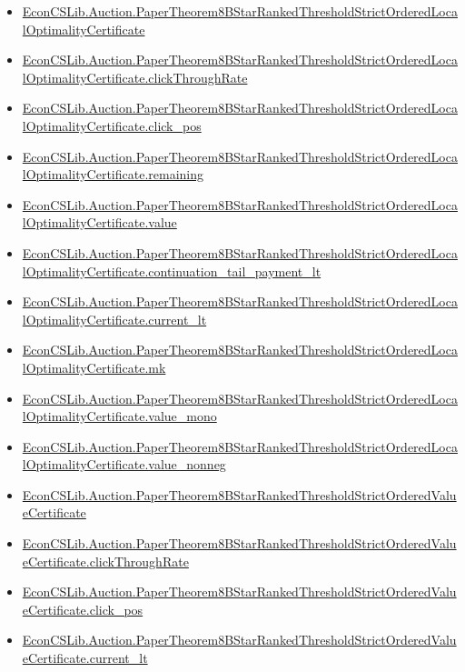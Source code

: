 \documentclass[10pt]{article}
\begin{document}
\begin{itemize}[leftmargin=1.2em]
\begin{itemize}[leftmargin=1.2em]
\item \hyperlink{library-prerequisite-26ead641d2091d6d}{EconCSLib.Auction.PaperTheorem8BStarRankedThresholdStrictOrderedLocalOptimalityCertificate}
\item \hyperlink{library-prerequisite-37cbd40ac442a1ae}{EconCSLib.Auction.PaperTheorem8BStarRankedThresholdStrictOrderedLocalOptimalityCertificate.clickThroughRate}
\item \hyperlink{library-prerequisite-9468ef40b82b377c}{EconCSLib.Auction.PaperTheorem8BStarRankedThresholdStrictOrderedLocalOptimalityCertificate.click\_pos}
\item \hyperlink{library-prerequisite-141b690500754a69}{EconCSLib.Auction.PaperTheorem8BStarRankedThresholdStrictOrderedLocalOptimalityCertificate.remaining}
\item \hyperlink{library-prerequisite-240fbc98de5d2de7}{EconCSLib.Auction.PaperTheorem8BStarRankedThresholdStrictOrderedLocalOptimalityCertificate.value}
\item \hyperlink{library-prerequisite-cdb2802a510fac10}{EconCSLib.Auction.PaperTheorem8BStarRankedThresholdStrictOrderedLocalOptimalityCertificate.continuation\_tail\_payment\_lt}
\item \hyperlink{library-prerequisite-4e4ebd43b03af68e}{EconCSLib.Auction.PaperTheorem8BStarRankedThresholdStrictOrderedLocalOptimalityCertificate.current\_lt}
\item \hyperlink{library-prerequisite-b24583fb61916b39}{EconCSLib.Auction.PaperTheorem8BStarRankedThresholdStrictOrderedLocalOptimalityCertificate.mk}
\item \hyperlink{library-prerequisite-31f4e4ec154d0eb3}{EconCSLib.Auction.PaperTheorem8BStarRankedThresholdStrictOrderedLocalOptimalityCertificate.value\_mono}
\item \hyperlink{library-prerequisite-79d5e74a75e1dff1}{EconCSLib.Auction.PaperTheorem8BStarRankedThresholdStrictOrderedLocalOptimalityCertificate.value\_nonneg}
\item \hyperlink{library-prerequisite-1de1595b2aa6e938}{EconCSLib.Auction.PaperTheorem8BStarRankedThresholdStrictOrderedValueCertificate}
\item \hyperlink{library-prerequisite-e03d9b83c142a5db}{EconCSLib.Auction.PaperTheorem8BStarRankedThresholdStrictOrderedValueCertificate.clickThroughRate}
\item \hyperlink{library-prerequisite-1f7db2868e437f38}{EconCSLib.Auction.PaperTheorem8BStarRankedThresholdStrictOrderedValueCertificate.click\_pos}
\item \hyperlink{library-prerequisite-f886f4b37eb43906}{EconCSLib.Auction.PaperTheorem8BStarRankedThresholdStrictOrderedValueCertificate.current\_lt}

\end{itemize}
\end{itemize}
\end{document}
